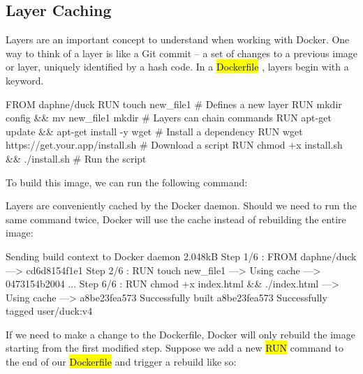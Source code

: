 \documentclass[12pt,initial,twoside,maitrise]{dms}
\newcommand{\inline}[1]{%
\begingroup%
\sethlcolor{slightgray}%
\hl{\ttfamily\small #1}%
\endgroup
}
\numberwithin{equation}{section}
\numberwithin{table}{chapter}
\numberwithin{figure}{chapter}
\begin{document}
\subsection{Layer Caching}

Layers are an important concept to understand when working with Docker. One way to think of a layer is like a Git commit -- a set of changes to a previous image or layer, uniquely identified by a hash code. In a \inline{Dockerfile}, layers begin with a keyword.

\begin{dockerlisting}
FROM daphne/duck
RUN touch new_file1                            # Defines a new layer
RUN mkdir config && mv new_file1 mkdir         # Layers can chain commands
RUN apt-get update && apt-get install -y wget  # Install a dependency
RUN wget https://get.your.app/install.sh       # Download a script
RUN chmod +x install.sh && ./install.sh        # Run the script
\end{dockerlisting}
%
To build this image, we can run the following command:

%
Layers are conveniently cached by the Docker daemon. Should we need to run the same command twice, Docker will use the cache instead of rebuilding the entire image:

\begin{pclisting}
Sending build context to Docker daemon  2.048kB
Step 1/6 : FROM daphne/duck
---> cd6d8154f1e1
Step 2/6 : RUN touch new_file1
---> Using cache
---> 0473154b2004
...
Step 6/6 : RUN chmod +x index.html && ./index.html
---> Using cache
---> a8be23fea573
Successfully built a8be23fea573
Successfully tagged user/duck:v4
\end{pclisting}
%
If we need to make a change to the Dockerfile, Docker will only rebuild the image starting from the first modified step. Suppose we add a new \inline{RUN} command to the end of our \inline{Dockerfile} and trigger a rebuild like so:
\end{document}
